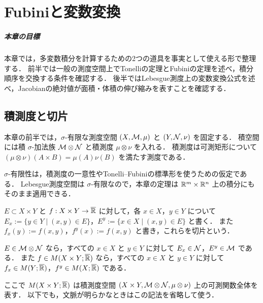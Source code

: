 \setcounter{chapter}{10}
\chapter{Fubiniと変数変換}

\paragraph{本章の目標}
本章では，多変数積分を計算するための2つの道具を事実として使える形で整理する．
前半では一般の測度空間上でTonelliの定理とFubiniの定理を述べ，積分順序を交換する条件を確認する．
後半ではLebesgue測度上の変数変換公式を述べ，Jacobianの絶対値が面積・体積の伸び縮みを表すことを確認する．

\section{積測度と切片}

本章の前半では，$\sigma$-有限な測度空間 $(X,\mathcal M,\mu)$ と $(Y,\mathcal N,\nu)$ を固定する．
積空間には積 $\sigma$-加法族 $\mathcal M\otimes\mathcal N$ と積測度 $\mu\otimes\nu$ を入れる．
積測度は可測矩形について $(\mu\otimes\nu)(A\times B)=\mu(A)\nu(B)$ を満たす測度である．

\begin{remark}
$\sigma$-有限性は，積測度の一意性やTonelli--Fubiniの標準形を使うための仮定である．
Lebesgue測度空間は $\sigma$-有限なので，本章の定理は $\mathbb R^m\times\mathbb R^n$ 上の積分にもそのまま適用できる．
\end{remark}

\begin{definition}[切片]\label{def:sections}
$E\subset X\times Y$ と $f:X\times Y\to\overline{\mathbb R}$ に対して，各 $x\in X$，$y\in Y$ について
$E_x:=\{y\in Y\mid (x,y)\in E\}$，$E^y:=\{x\in X\mid (x,y)\in E\}$ と書く．
また $f_x(y):=f(x,y)$，$f^y(x):=f(x,y)$ と書き，これらを切片という．
\end{definition}

\begin{theorem}[切片の可測性]\label{thm:sections-measurable-general}
$E\in\mathcal M\otimes\mathcal N$ なら，すべての $x\in X$ と $y\in Y$ に対して
$E_x\in\mathcal N$，$E^y\in\mathcal M$ である．
また $f\in M(X\times Y;\overline{\mathbb R})$ なら，すべての $x\in X$ と $y\in Y$ に対して
$f_x\in M(Y;\overline{\mathbb R})$，$f^y\in M(X;\overline{\mathbb R})$ である．
\end{theorem}

\begin{remark}
ここで $M(X\times Y;\overline{\mathbb R})$ は積測度空間 $(X\times Y,\mathcal M\otimes\mathcal N,\mu\otimes\nu)$ 上の可測関数全体を表す．
以下でも，文脈が明らかなときはこの記法を省略して使う．
\end{remark}

